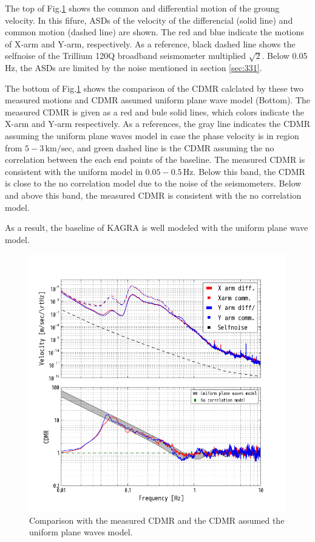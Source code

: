 The top of Fig.\ref{img:img319} shows the common and differential motion of the groung velocity. In this fifure, ASDs of the velocity of the differencial (solid line) and common motion (dashed line) are shown. The red and blue indicate the motions of X-arm and Y-arm, respectively. As a reference, black dashed line shows the selfnoise of the Trillium 120Q broadband seismometer multiplied $\sqrt{2}$. Below 0.05 Hz, the ASDs are limited by the noise mentioned in section \cref{sec:331}. 

The bottom of Fig.\ref{img:img319} shows the comparison of the CDMR calclated by these two measured motions and CDMR assumed uniform plane wave model (Bottom). The measured CDMR is given as a red and bule solid lines, which colors indicate the X-arm and Y-arm respectively. As a references, the gray line indicates the CDMR assuming the uniform plane waves model in case the phase velocity is in region from $5 - 3\,\mathrm{km/sec}$, and green dashed line is the CDMR assuming the no correlation between the each end points of the baseline. The measured CDMR is consistent with the uniform model in $0.05 - 0.5\,\mathrm{Hz}$. Below this band, the CDMR is close to the no correlation model due to the noise of the seismometers. Below and above this band, the measured CDMR is consistent with the no correlation model.

As a result, the baseline of KAGRA is well modeled with the uniform plane wave model. 

\begin{figure}[p]
    \begin{center}   
      \includegraphics[width=13.0cm]{./img_chap3/img319.png}
      \caption{Comparison with the measured CDMR and the CDMR assumed the uniform plane waves model.}\label{img:img319}
    \end{center}
\end{figure}


